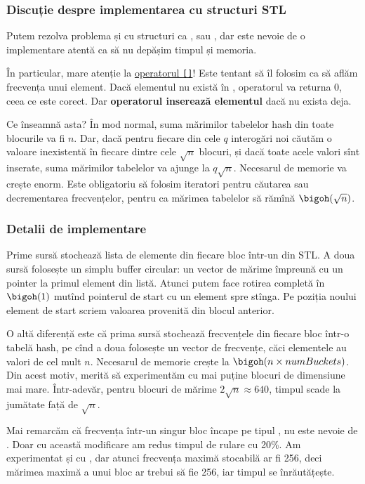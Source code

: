 \subsubsection*{Discuție despre implementarea cu structuri STL}

Putem rezolva problema și cu structuri ca ,  sau , dar este nevoie de o implementare atentă ca să nu depășim timpul și memoria.

În particular, mare atenție la \href{https://en.cppreference.com/w/cpp/container/map/operator_at}{operatorul \texttt{[]}}! Este tentant să îl folosim ca să aflăm frecvența unui element. Dacă elementul nu există în , operatorul va returna 0, ceea ce este corect. Dar \textbf{operatorul inserează elementul} dacă nu exista deja.

Ce înseamnă asta? În mod normal, suma mărimilor tabelelor hash din toate blocurile va fi $n$. Dar, dacă pentru fiecare din cele $q$ interogări noi căutăm o valoare inexistentă în fiecare dintre cele $\sqrt{n}$ blocuri, și dacă toate acele valori sînt inserate, suma mărimilor tabelelor va ajunge la $q \sqrt{n}$. Necesarul de memorie va crește enorm. Este obligatoriu să folosim iteratori pentru căutarea sau decrementarea frecvențelor, pentru ca mărimea tabelelor să rămînă $\bigoh(\sqrt{n})$.

\subsubsection*{Detalii de implementare}

Prime sursă stochează lista de elemente din fiecare bloc într-un  din STL. A doua sursă folosește un simplu buffer circular: un vector de mărime  împreună cu un pointer la primul element din listă. Atunci putem face rotirea completă în $\bigoh(1)$ mutînd pointerul de start cu un element spre stînga. Pe poziția noului element de start scriem valoarea provenită din blocul anterior.

O altă diferență este că prima sursă stochează frecvențele din fiecare bloc într-o tabelă hash, pe cînd a doua folosește un vector de frecvențe, căci elementele au valori de cel mult $n$. Necesarul de memorie crește la $\bigoh(n \times numBuckets)$. Din acest motiv, merită să experimentăm cu mai puține blocuri de dimensiune mai mare. Într-adevăr, pentru blocuri de mărime $2 \sqrt{n} \approx 640$, timpul scade la jumătate față de $\sqrt{n}$.

Mai remarcăm că frecvența într-un singur bloc încape pe tipul , nu este nevoie de . Doar cu această modificare am redus timpul de rulare cu 20\%. Am experimentat și cu , dar atunci frecvența maximă stocabilă ar fi 256, deci mărimea maximă a unui bloc ar trebui să fie 256, iar timpul se înrăutățește.


